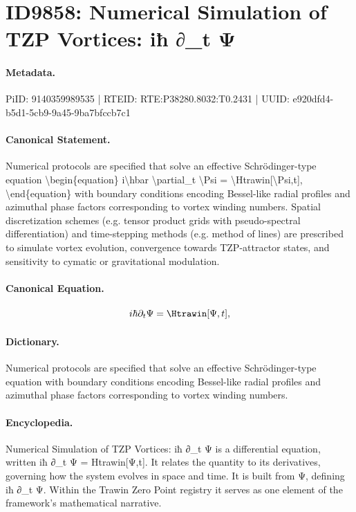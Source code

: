 \section*{ID9858: Numerical Simulation of TZP Vortices: iħ ∂\_t Ψ}
\paragraph{Metadata.}
PiID: 9140359989535 | RTEID: RTE:P38280.8032:T0.2431 | UUID: e920dfd4-b5d1-5cb9-9a45-9ba7bfccb7c1

\paragraph{Canonical Statement.}
Numerical protocols are specified that solve an effective Schrödinger-type equation \textbackslash{}begin\{equation\} i\textbackslash{}hbar \textbackslash{}partial\_t \textbackslash{}Psi = \textbackslash{}Htrawin[\textbackslash{}Psi,t], \textbackslash{}end\{equation\} with boundary conditions encoding Bessel-like radial profiles and azimuthal phase factors corresponding to vortex winding numbers. Spatial discretization schemes (e.g. tensor product grids with pseudo-spectral differentiation) and time-stepping methods (e.g. method of lines) are prescribed to simulate vortex evolution, convergence towards TZP-attractor states, and sensitivity to cymatic or gravitational modulation.

\paragraph{Canonical Equation.}
\[
i\hbar \partial_t \Psi = \Htrawin[\Psi,t],
\]

\paragraph{Dictionary.}
Numerical protocols are specified that solve an effective Schrödinger-type equation with boundary conditions encoding Bessel-like radial profiles and azimuthal phase factors corresponding to vortex winding numbers.

\paragraph{Encyclopedia.}
Numerical Simulation of TZP Vortices: iħ ∂\_t Ψ is a differential equation, written iħ ∂\_t Ψ = Htrawin[Ψ,t]. It relates the quantity to its derivatives, governing how the system evolves in space and time. It is built from Ψ, defining iħ ∂\_t Ψ. Within the Trawin Zero Point registry it serves as one element of the framework's mathematical narrative.
